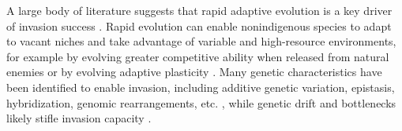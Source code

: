 \documentclass[12pt]{article}\usepackage[]{graphicx}\usepackage[]{color}
\begin{document}
	
	A large body of literature suggests that rapid adaptive evolution is a key driver of invasion success  \parencite{Sakai2001,Reznick2001, Lambrinos2004,Williamson1997,Thompson1998, Cox2004, Prentis2008,Colautti2015,Lee2002invasion, Fenollosa2019,Clements2011}.  Rapid evolution can enable nonindigenous species to adapt to vacant niches and take advantage of variable and high-resource environments, for example by evolving greater competitive ability  when released from natural enemies \parencite{Blossey1995,Bossdorf2005} or by evolving adaptive plasticity \parencite{Richards2006}. Many genetic characteristics have been identified to enable invasion, including additive genetic variation, epistasis, hybridization, genomic rearrangements, etc. \parencite[Reviewed in][]{Lee2002invasion}, while genetic drift and bottlenecks likely stifle invasion capacity \parencite{Bock2015}. 
	
\end{document}
